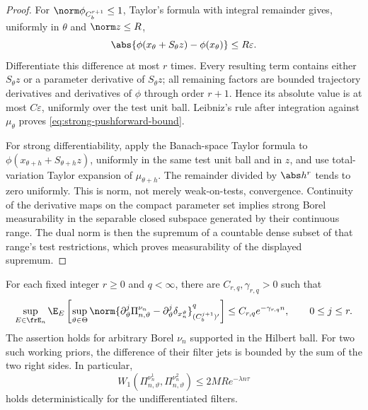 \begin{proof}
For \(\norm\phi_{C_b^{r+1}}\le1\), Taylor's formula with integral remainder
gives, uniformly in \(\theta\) and \(\norm z\le R\),
\[
 \abs{\phi(x_\theta+S_\theta z)-\phi(x_\theta)}\le R\varepsilon.
\]
Differentiate this difference at most \(r\) times.  Every resulting term
contains either \(S_\theta z\) or a parameter derivative of \(S_\theta z\);
all remaining factors are bounded trajectory derivatives and derivatives of
\(\phi\) through order \(r+1\).  Hence its absolute value is at most
\(C\varepsilon\), uniformly over the test unit ball.  Leibniz's rule after
integration against \(\mu_\theta\) proves \eqref{eq:strong-pushforward-bound}.

For strong differentiability, apply the Banach-space Taylor formula to
\(\phi(x_{\theta+h}+S_{\theta+h}z)\), uniformly in the same test unit ball and
in \(z\), and use total-variation Taylor expansion of \(\mu_{\theta+h}\).
The remainder divided by \(\abs h^r\) tends to zero uniformly.  This is norm,
not merely weak-on-tests, convergence.  Continuity of the derivative maps on
the compact parameter set implies strong Borel measurability in the separable
closed subspace generated by their continuous range.  The dual norm is then
the supremum of a countable dense subset of that range's test restrictions,
which proves measurability of the displayed supremum.
\end{proof}

\begin{theorem}
\label{thm:filter-jets}
For each fixed integer \(r\ge0\) and \(q<\infty\), there are
\(C_{r,q},\gamma_{r,q}>0\) such that
\begin{equation}
 \sup_{E\in\frE_n}
 \E_E\left[
 \sup_{\vartheta\in\Theta}
 \norm{\partial_\vartheta^j\Pi_{n,\vartheta}^{\nu_n}
       -\partial_\vartheta^j\delta_{x_n^\vartheta}}_{(C_b^{j+1})'}^q
 \right]
 \le C_{r,q}e^{-\gamma_{r,q}n},
 \qquad 0\le j\le r.
 \label{eq:filter-jet-decay}
\end{equation}
The assertion holds for arbitrary Borel \(\nu_n\) supported in the Hilbert
ball.  For two such working priors, the difference of their filter jets is
bounded by the sum of the two right sides.  In particular,
\[
 W_1(\Pi_{n,\vartheta}^{\nu_n^1},
     \Pi_{n,\vartheta}^{\nu_n^2})
 \le2MRe^{-\lambda n\tau}
\]
holds deterministically for the undifferentiated filters.
\end{theorem}

